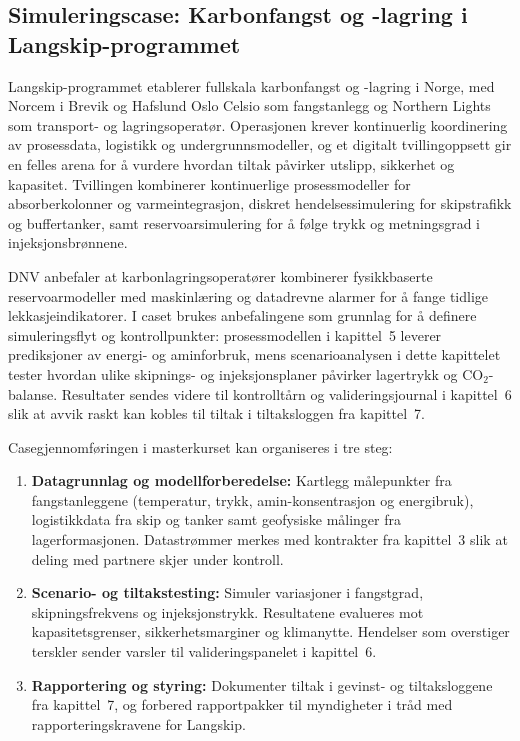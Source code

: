 \subsection{Simuleringscase: Karbonfangst og -lagring i Langskip-programmet}
Langskip-programmet etablerer fullskala karbonfangst og -lagring i Norge, med Norcem i Brevik og Hafslund Oslo Celsio som fangstanlegg og Northern Lights som transport- og lagringsoperatør.\citep{oed2023langskip,northernlights2024readiness} Operasjonen krever kontinuerlig koordinering av prosessdata, logistikk og undergrunnsmodeller, og et digitalt tvillingoppsett gir en felles arena for å vurdere hvordan tiltak påvirker utslipp, sikkerhet og kapasitet. Tvillingen kombinerer kontinuerlige prosessmodeller for absorberkolonner og varmeintegrasjon, diskret hendelsessimulering for skipstrafikk og buffertanker, samt reservoarsimulering for å følge trykk og metningsgrad i injeksjonsbrønnene.

DNV anbefaler at karbonlagringsoperatører kombinerer fysikkbaserte reservoarmodeller med maskinlæring og datadrevne alarmer for å fange tidlige lekkasjeindikatorer.\citep{dnv2023ccsmonitoring} I caset brukes anbefalingene som grunnlag for å definere simuleringsflyt og kontrollpunkter: prosessmodellen i kapittel~5 leverer prediksjoner av energi- og aminforbruk, mens scenarioanalysen i dette kapittelet tester hvordan ulike skipnings- og injeksjonsplaner påvirker lagertrykk og CO$_2$-balanse. Resultater sendes videre til kontrolltårn og valideringsjournal i kapittel~6 slik at avvik raskt kan kobles til tiltak i tiltaksloggen fra kapittel~7.

Casegjennomføringen i masterkurset kan organiseres i tre steg:
\begin{enumerate}
    \item \textbf{Datagrunnlag og modellforberedelse:} Kartlegg målepunkter fra fangstanleggene (temperatur, trykk, amin-konsentrasjon og energibruk), logistikkdata fra skip og tanker samt geofysiske målinger fra lagerformasjonen. Datastrømmer merkes med kontrakter fra kapittel~3 slik at deling med partnere skjer under kontroll.
    \item \textbf{Scenario- og tiltakstesting:} Simuler variasjoner i fangstgrad, skipningsfrekvens og injeksjonstrykk. Resultatene evalueres mot kapasitetsgrenser, sikkerhetsmarginer og klimanytte. Hendelser som overstiger terskler sender varsler til valideringspanelet i kapittel~6.
    \item \textbf{Rapportering og styring:} Dokumenter tiltak i gevinst- og tiltaksloggene fra kapittel~7, og forbered rapportpakker til myndigheter i tråd med rapporteringskravene for Langskip.
\end{enumerate}


